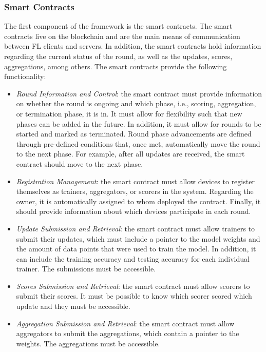 \subsubsection{Smart Contracts}\label{meth:smart_contracts}

The first component of the framework is the smart contracts. The smart contracts live on the blockchain and are the main means of communication between FL clients and servers. In addition, the smart contracts hold information regarding the current status of the round, as well as the updates, scores, aggregations, among others. The smart contracts provide the following functionality:

\begin{itemize}
    \item \textit{Round Information and Control}: the smart contract must provide information on whether the round is ongoing and which phase, i.e., scoring, aggregation, or termination phase, it is in. It must allow for flexibility such that new phases can be added in the future. In addition, it must allow for rounds to be started and marked as terminated. Round phase advancements are defined through pre-defined conditions that, once met, automatically move the round to the next phase. For example, after all updates are received, the smart contract should move to the next phase.
    
    \item \textit{Registration Management}: the smart contract must allow devices to register themselves as trainers, aggregators, or scorers in the system. Regarding the owner, it is automatically assigned to whom deployed the contract. Finally, it should provide information about which devices participate in each round.
    
    \item \textit{Update Submission and Retrieval}: the smart contract must allow trainers to submit their updates, which must include a pointer to the model weights and the amount of data points that were used to train the model. In addition, it can include the training accuracy and testing accuracy for each individual trainer. The submissions must be accessible.
    
    \item \textit{Scores Submission and Retrieval}: the smart contract must allow scorers to submit their scores. It must be possible to know which scorer scored which update and they must be accessible.
    
    \item \textit{Aggregation Submission and Retrieval}: the smart contract must allow aggregators to submit the aggregations, which contain a pointer to the weights. The aggregations must be accessible.
\end{itemize}

